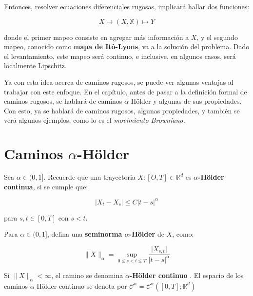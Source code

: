Entonces, resolver ecuaciones diferenciales rugosas, implicará hallar dos funciones:

\[
	X \mapsto (X, \mathbb{X}) \mapsto Y
\]

donde el primer mapeo consiste en agregar más información a $X$, y el segundo mapeo, conocido como \textbf{mapa de Itô-Lyons}, va a la solución del problema. Dado el levantamiento, este mapeo será continuo, e inclusive, en algunos casos, será localmente Lipschitz.

Ya con esta idea acerca de caminos rugosos, se puede ver algunas ventajas al trabajar con este enfoque. En el capítulo, antes de pasar a la definición formal de caminos rugosos, se hablará de caminos $\alpha$-Hölder y algunas de sus propiedades. Con esto, ya se hablará de caminos rugosos, algunas propiedades, y también se verá algunos ejemplos, como lo es el \textit{movimiento Browniano.}









\section{Caminos $\alpha$-Hölder}


Sea $\alpha \in (0, 1]$. Recuerde que una trayectoria $X: [O, T] \in \mathbb{R}^d$ es $\alpha$\textbf{-Hölder continua}, si se cumple que:

\[
	\lvert X_t - X_s \rvert \leq C \lvert t - s \rvert^{\alpha}
\]

para $s, t \in [0,T]$ con $s < t$.

\begin{boxDef}
	Para $\alpha \in (0, 1]$, defina una \textbf{seminorma $\alpha$-Hölder} de $X$, como:

	\[
		\lVert X \rVert_{\alpha} = \sup_{0 \leq s < t \leq T} \frac{ \lvert X_{s,t} \rvert }{ \lvert t - s \rvert^{\alpha} }
	\]

	Si $\lVert X \rVert_{\alpha} < \infty$, el camino se denomina \textbf{ $\alpha$-Hölder continuo }. El espacio de los caminos $\alpha$-Hölder continuo se denota por $\mathcal{C}^{\alpha} = \mathcal{C}^{\alpha}([0,T]; \mathbb{R}^d) $

\end{boxDef}









